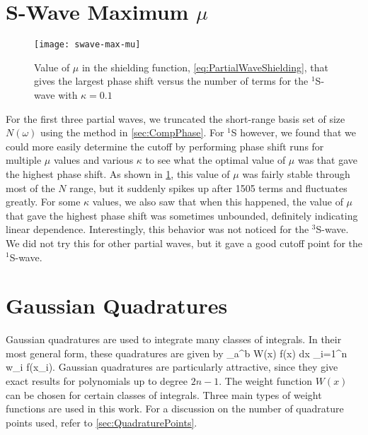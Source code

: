 \documentclass[Dissertation.tex]{subfiles}
\begin{document}
\section{S-Wave Maximum \texorpdfstring{$\mu$}{mu}}
\label{sec:MaxMu}

\begin{figure}
	\centering
	\texttt{[image: swave-max-mu]}
	\caption[Maximum $\mu$ for $^1$S-wave]{Value of $\mu$ in the shielding function, \cref{eq:PartialWaveShielding}, that gives the largest phase shift versus the number of terms for the $^1$S-wave with $\kappa = 0.1$}
	\label{fig:swave-max-mu}
\end{figure}

For the first three partial waves, we truncated the short-range basis set of
size $N(\omega)$ using the method in \cref{sec:CompPhase}. For $^1$S however,
we found that we could more easily determine the cutoff by performing phase 
shift runs for multiple $\mu$ values and various $\kappa$ to see what the 
optimal value of $\mu$ was that gave the highest phase shift. As shown in
\cref{fig:swave-max-mu}, this value of $\mu$ was fairly stable through most of
the $N$ range, but it suddenly spikes up after 1505 terms and fluctuates
greatly. For some $\kappa$ values, we also saw that when this happened, the
value of $\mu$ that gave the highest phase shift was sometimes unbounded,
definitely indicating linear dependence. Interestingly, this behavior was
not noticed for the $^3$S-wave. We did not try this for other partial waves,
but it gave a good cutoff point for the $^1$S-wave.


\section{Gaussian Quadratures}
\label{sec:GaussQuad}


Gaussian quadratures are used to integrate many classes of integrals. In their
most general form, these quadratures are given by \cite[p.887]{Abramowitz1965}
\beq
\label{eq:GeneralQuadratures}
\int_a^b W(x) f(x) dx \approx \sum_{i=1}^n w_i f(x_i).
\eeq
Gaussian quadratures are particularly attractive, since they give exact 
results for polynomials up to degree $2n-1$. The weight function $W(x)$ can 
be chosen for certain classes of integrals. Three main types of weight 
functions are used in this work. For a discussion on the number of quadrature 
points used, refer to \cref{sec:QuadraturePoints}.
\end{document}
